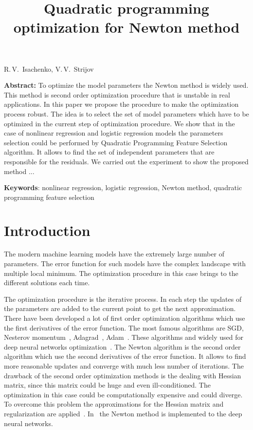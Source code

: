 \documentclass[a4paper,12pt]{article}
\theoremstyle{plain} %
\theoremstyle{definition} %
\theoremstyle{remark} %
\begin{document}
		
		\title
	{Quadratic programming optimization for Newton method}
	\date{}
	\maketitle
	\begin{center}
		R.\,V.~Isachenko,
		V.\,V.~Strijov
	\end{center}
	\textbf{Abstract:} 
	To optimize the model parameters the Newton method is widely used. 
	This method is second order optimization procedure that is unstable in real applications. 
	In this paper we propose the procedure to make the optimization process robust. 
	The idea is to select the set of model parameters which have to be optimized in the current step of optimization procedure.
	We show that in the case of nonlinear regression and logistic regression models the parameters selection could be performed by Quadratic Programming Feature Selection algorithm.
	It allows to find the set of independent parameters that are responsible for the residuals.
	We carried out the experiment to show the proposed method ...
	
	\bigskip
	\textbf{Keywords}: nonlinear regression, logistic regression, Newton method, quadratic programming feature selection
	
	\section*{Introduction}
	The modern machine learning models have the extremely large number of parameters. 
	The error function for such models have the complex landscape with multiple local minimum. 
	The optimization procedure in this case brings to the different solutions each time.
	
	The optimization procedure is the iterative process. 
	In each step the updates of the parameters are added to the current point to get the next approximation.
	There have been developed a lot of first order optimization algorithms which use the first derivatives of the error function. 
	The most famous algorithms are SGD, Nesterov momentum~\cite{nesterov1983momentum}, Adagrad~\cite{duchi2011adagrad}, Adam~\cite{kingma2014adam}. 
	These algorithms and widely used for deep neural networks optimization~\cite{goodfellow2016deeplearningbook}. 
	The Newton algorithm is the second order algorithm which use the second derivatives of the error function. 
	It allows to find more reasonable updates and converge with much less number of iterations.
	The drawback of the second order optimization methods is the dealing with Hessian matrix, since this matrix could be huge and even ill-conditioned. 
	The optimization in this case could be computationally expensive and could diverge. 
	To overcome this problem the approximations for the Hessian matrix and regularization are applied~\cite{avriel2003nonlinear,blaschke1997convergence}.
	In~\cite{botev2017newtondeeplearning} the Newton method is implemented to the deep neural networks.
	
\end{document}
